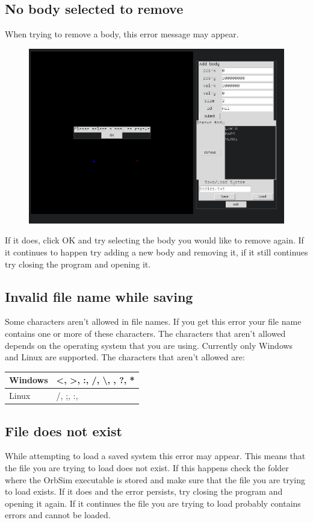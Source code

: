 \documentclass[a4paper,11pt,titlepage]{article}
\begin{document}
\subsection{No body selected to remove}
When trying to remove a body, this error message may appear.
\begin{figure}[H]
	\includegraphics[width=\textwidth]{../img/rm3.png}
\end{figure}

If it does, click OK and try selecting the body you would like to remove again.
If it continues to happen try adding a new body and removing it, if it still
continues try closing the program and opening it.

\subsection{Invalid file name while saving}
Some characters aren't allowed in file names. If you get this error your file
name contains one or more of these characters. The characters that aren't
allowed depends on the operating system that you are using. Currently only
Windows and Linux are supported. The characters that aren't allowed are: \\

\begin{tabular}{l|l}
	Windows & \textless, \textgreater, :, /, \textbackslash{}, \textbar, ?,
	* \\ \hline 
	Linux & /, ;, :, \textbar
\end{tabular}

\subsection{File does not exist}
While attempting to load a saved system this error may appear. This means that
the file you are trying to load does not exist. If this happens check the folder
where the OrbSim executable is stored and make sure that the file you are trying
to load exists. If it does and the error persists, try closing the program and
opening it again. If it continues the file you are trying to load probably
contains errors and cannot be loaded.
\end{document}
